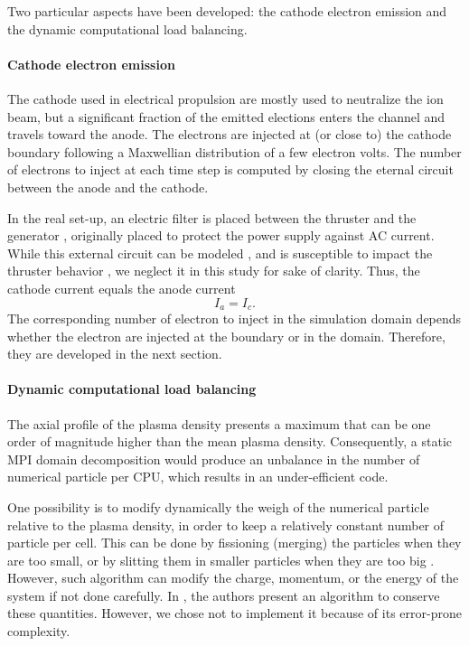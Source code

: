 Two particular aspects have been developed\string: the cathode electron emission and the dynamic computational load balancing.

\paragraph{Cathode electron emission\\}
The cathode used in electrical propulsion are mostly used to neutralize the ion beam, but a significant fraction of the emitted elections enters the channel and travels toward the anode.
The electrons are injected at (or close to) the cathode boundary following a Maxwellian distribution of a few electron volts.
The number of electrons to inject at each time step is computed by closing the eternal circuit between the anode and the cathode.

In the real set-up, an electric filter is placed between the thruster and the generator \citep{barral2008}, originally placed to protect the power supply against AC current.
While this external circuit can be modeled \citep{verboncoeur1993}, and is susceptible to impact the thruster behavior \citep{barral2008,wei2017}, we neglect it in this study for sake of clarity.
Thus, the cathode current equals the anode current \[ I_a = I_c. \]
The corresponding number of electron to inject in the simulation domain depends whether the electron are injected at the boundary or in the domain. 
Therefore, they are developed in the next section.

\paragraph{Dynamic computational load balancing\\}
The axial profile of the plasma density presents a maximum that can be one order of magnitude higher than the mean plasma density.
Consequently, a static MPI domain decomposition would produce an unbalance in the number of numerical particle per CPU, which results in an under-efficient code.

One possibility is to modify dynamically the weigh of the numerical particle relative to the plasma density, in order to keep a relatively constant number of particle per cell.
This can be done by fissioning (merging) the particles when they are too small, or by slitting them in smaller particles when they are too big \citep{shon2001,teunissen2014}.
However, such algorithm can modify the charge, momentum, or the energy of the system if not done carefully.
In \citet{vranic2015}, the authors present an algorithm to  conserve these quantities.
However, we chose not to implement it because of its error-prone complexity.

